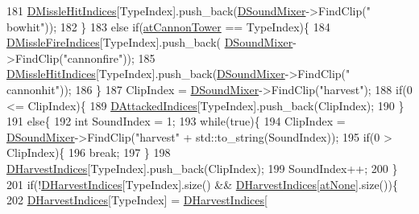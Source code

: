 \begin{DoxyCode}
181             \hyperlink{classCSoundEventRenderer_aa551953be1c1e7926432996c78c6d8d8}{DMissleHitIndices}[TypeIndex].push\_back(\hyperlink{classCSoundEventRenderer_a5abf598a7e8783d9cc78e0d33a65c9c2}{DSoundMixer}->FindClip(\textcolor{stringliteral}{"
      bowhit"}));   
182         \}
183         \textcolor{keywordflow}{else} \textcolor{keywordflow}{if}(\hyperlink{GameDataTypes_8h_a5600d4fc433b83300308921974477feca226f6f1968ce76c97cdabb780a6c289d}{atCannonTower} == TypeIndex)\{
184             \hyperlink{classCSoundEventRenderer_ab781b03b940441c7d23fe1d6031d773e}{DMissleFireIndices}[TypeIndex].push\_back(
      \hyperlink{classCSoundEventRenderer_a5abf598a7e8783d9cc78e0d33a65c9c2}{DSoundMixer}->FindClip(\textcolor{stringliteral}{"cannonfire"}));
185             \hyperlink{classCSoundEventRenderer_aa551953be1c1e7926432996c78c6d8d8}{DMissleHitIndices}[TypeIndex].push\_back(\hyperlink{classCSoundEventRenderer_a5abf598a7e8783d9cc78e0d33a65c9c2}{DSoundMixer}->FindClip(\textcolor{stringliteral}{"
      cannonhit"}));   
186         \}
187         ClipIndex = \hyperlink{classCSoundEventRenderer_a5abf598a7e8783d9cc78e0d33a65c9c2}{DSoundMixer}->FindClip(\textcolor{stringliteral}{"harvest"});
188         \textcolor{keywordflow}{if}(0 <= ClipIndex)\{
189             \hyperlink{classCSoundEventRenderer_a5ffc7dd4911c09c23987c6d1a8776c26}{DAttackedIndices}[TypeIndex].push\_back(ClipIndex);
190         \}
191         \textcolor{keywordflow}{else}\{
192             \textcolor{keywordtype}{int} SoundIndex = 1;
193             \textcolor{keywordflow}{while}(\textcolor{keyword}{true})\{
194                 ClipIndex = \hyperlink{classCSoundEventRenderer_a5abf598a7e8783d9cc78e0d33a65c9c2}{DSoundMixer}->FindClip(\textcolor{stringliteral}{"harvest"} + std::to\_string(SoundIndex));
195                 \textcolor{keywordflow}{if}(0 > ClipIndex)\{
196                     \textcolor{keywordflow}{break};   
197                 \}
198                 \hyperlink{classCSoundEventRenderer_abe64071cbc49cffab8a5c6160b7f821d}{DHarvestIndices}[TypeIndex].push\_back(ClipIndex);
199                 SoundIndex++;
200             \}
201             \textcolor{keywordflow}{if}(!\hyperlink{classCSoundEventRenderer_abe64071cbc49cffab8a5c6160b7f821d}{DHarvestIndices}[TypeIndex].size() && 
      \hyperlink{classCSoundEventRenderer_abe64071cbc49cffab8a5c6160b7f821d}{DHarvestIndices}[\hyperlink{GameDataTypes_8h_a5600d4fc433b83300308921974477feca82fb51718e2c00981a2d37bc6fe92593}{atNone}].size())\{
202                 \hyperlink{classCSoundEventRenderer_abe64071cbc49cffab8a5c6160b7f821d}{DHarvestIndices}[TypeIndex] = \hyperlink{classCSoundEventRenderer_abe64071cbc49cffab8a5c6160b7f821d}{DHarvestIndices}[

\end{DoxyCode}
